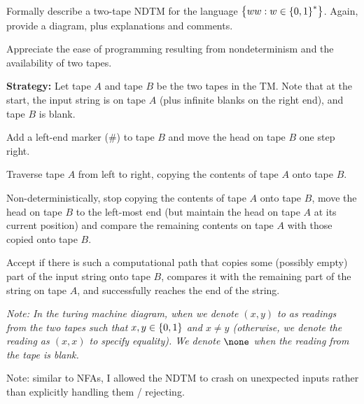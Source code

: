 \begin{problem}
  Formally describe a two-tape NDTM for the language
  $\left\{ ww : w \in \left\{0, 1\right\}^*\right\}$.
  Again, provide a diagram, plus explanations and comments.

  \step
  Appreciate the ease of programming resulting from nondeterminism
  and the availability of two tapes.
\end{problem}
\begin{Answer}
  \textbf{Strategy:}
  Let tape $A$ and tape $B$ be the two tapes in the TM.
  Note that at the start, the input string is on tape $A$
  (plus infinite blanks on the right end), and tape $B$ is blank.

  \begin{enumroman}
    \item Add a left-end marker ($\#$) to tape $B$ and move the head
      on tape $B$ one step right.

    \item Traverse tape $A$ from left to right, copying the contents of tape $A$
      onto tape $B$.

    \item Non-deterministically, stop copying the contents of tape $A$ onto tape $B$,
      move the head on tape $B$ to the left-most end (but maintain the head on tape $A$
      at its current position) and compare the remaining contents on tape $A$
      with those copied onto tape $B$.

    \item Accept if there is such a computational path that copies some (possibly empty)
      part of the input string onto tape $B$, compares it with the remaining part
      of the string on tape $A$, and successfully reaches the end of the string.
  \end{enumroman}

  \step
  \emph{
    Note: In the turing machine diagram,
    when we denote $(x, y)$ to as readings from the two tapes
    such that $x, y \in \left\{0, 1\right\}$ and $x \neq y$
    (otherwise, we denote the reading as $(x, x)$ to specify equality).
    We denote $\none$ when the reading from the tape is blank.
  }
    
  
  \newpage
  \bigskip
  \step
  Note: similar to NFAs, I allowed the NDTM to crash on unexpected inputs
  rather than explicitly handling them / rejecting.
    
  \begin{figure}[H]
    \centering
\end{figure}
\end{Answer}
